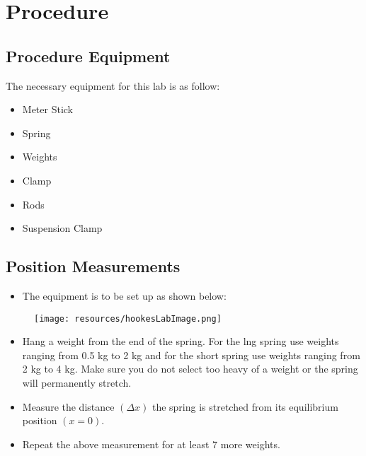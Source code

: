 \chapter{Procedure}

\section{Procedure Equipment}

The necessary equipment for this lab is as follow: 
\begin{itemize}
  \item Meter Stick
  \item Spring
  \item Weights 
  \item Clamp
  \item Rods
  \item Suspension Clamp
\end{itemize}

\section{Position Measurements}

\begin{itemize}
  \item The equipment is to be set up as shown below:
\end{itemize}

\begin{figure}[h!]
  \centerline{\texttt{[image: resources/hookesLabImage.png]}}
\end{figure}

\begin{itemize}
  \item Hang a weight from the end of the spring. For the lng spring use weights ranging
        from 0.5 kg to 2 kg and for the short spring use weights ranging from 2 kg to 4 
        kg. Make sure you do not select too heavy of a weight or the spring will 
        permanently stretch.
  \item Measure the distance $(\Delta x)$ the spring is stretched from its equilibrium
        position $(x = 0)$.
  \item Repeat the above measurement for at least 7 more weights.
\end{itemize}
